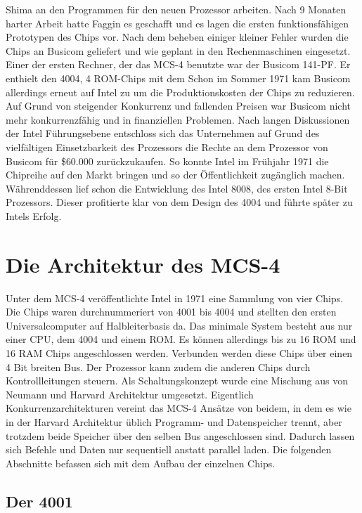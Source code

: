 Shima an den Programmen für den neuen Prozessor arbeiten.
Nach 9 Monaten harter Arbeit hatte Faggin es geschafft und es lagen die ersten funktionsfähigen Prototypen des Chips vor.
Nach dem beheben einiger kleiner Fehler wurden die Chips an Busicom geliefert und wie geplant in den Rechenmaschinen eingesetzt. Einer der ersten Rechner, der das MCS-4 benutzte war der Busicom 141-PF. Er enthielt den 4004, 4 ROM-Chips mit dem Schon im Sommer 1971 kam
 Busicom allerdings erneut auf Intel zu um die Produktionskosten der Chips zu reduzieren. Auf Grund von steigender Konkurrenz und fallenden Preisen war Busicom nicht mehr konkurrenzfähig und in finanziellen Problemen. Nach langen Diskussionen der Intel Führungsebene entschloss sich das Unternehmen auf Grund des vielfältigen Einsetzbarkeit des Prozessors die Rechte an dem Prozessor von Busicom für {\$}60.000 zurückzukaufen. So konnte Intel im Frühjahr 1971 die Chipreihe auf den Markt bringen und so der Öffentlichkeit zugänglich machen. Währenddessen lief schon die Entwicklung des Intel 8008, des ersten Intel 8-Bit Prozessors. Dieser profitierte klar von dem Design des 4004 und führte später zu Intels Erfolg.
 
\section{Die Architektur des MCS-4}
Unter dem MCS-4 veröffentlichte Intel in 1971 eine Sammlung von vier Chips. Die Chips waren durchnummeriert von 4001 bis 4004 und stellten den ersten Universalcomputer auf Halbleiterbasis da. Das minimale System besteht aus nur einer CPU, dem 4004 und einem ROM. Es können allerdings bis zu 16 ROM und 16 RAM Chips angeschlossen werden. Verbunden werden diese Chips über einen 4 Bit breiten Bus. Der Prozessor kann zudem die anderen Chips durch Kontrollleitungen steuern. Als Schaltungskonzept wurde eine Mischung aus von Neumann und Harvard Architektur umgesetzt. Eigentlich Konkurrenzarchitekturen vereint das MCS-4 Ansätze von beidem, in dem es wie in der Harvard Architektur üblich Programm- und Datenspeicher trennt, aber trotzdem beide Speicher über den selben Bus angeschlossen sind. Dadurch lassen sich Befehle und Daten nur sequentiell anstatt parallel laden. Die folgenden Abschnitte befassen sich mit dem Aufbau der einzelnen Chips.

\subsection{Der 4001}

